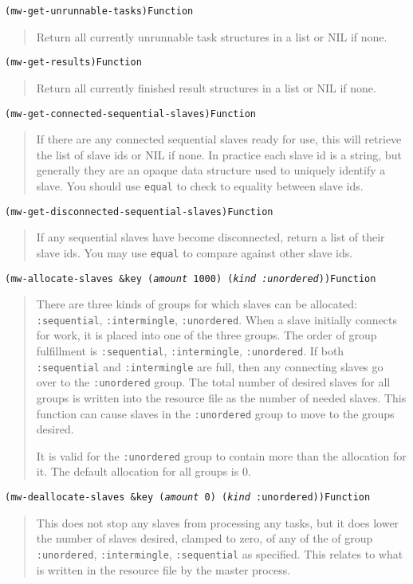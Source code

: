 \documentclass[titlepage,12pt]{book}
\newcommand{\xsmall}{\latexhtml{\small}{}}
\newcommand{\xnormalsize}{\latexhtml{\normalsize}{}}
\newcommand{\un}{\texttt{:unordered}\xspace}
\newcommand{\inter}{\texttt{:intermingle}\xspace}
\newcommand{\seq}{\texttt{:sequential}\xspace}
\newcommand{\func}[1]{\xsmall\mbox{\uppercase{\texttt{#1}}}\xnormalsize\xspace}
\newcommand{\apifunc}[2]{\noindent\xsmall\texttt{(#1)}\hspace*{\fill}\xnormalsize\texttt{#2}}
\newenvironment{apientry}[2]
	{\apifunc{#1}{#2}\begin{quotation}}
	{\end{quotation}}
\begin{document}
\begin{apientry}
{mw-get-unrunnable-tasks}
{Function}
Return all currently unrunnable task structures in a list or NIL if none.
\end{apientry}

\begin{apientry}
{mw-get-results}
{Function}
Return all currently finished result structures in a list or NIL if none.
\end{apientry}

\begin{apientry}
{mw-get-connected-sequential-slaves}
{Function}
If there are any connected sequential slaves ready for use, this will
retrieve the list of slave ids or NIL if none. In practice each slave
id is a string, but generally they are an opaque data structure used
to uniquely identify a slave. You should use \func{equal} to check
to equality between slave ids.
\end{apientry}

\begin{apientry}
{mw-get-disconnected-sequential-slaves}
{Function}
If any sequential slaves have become disconnected, return a list of
their slave ids. You may use \func{equal} to compare against other
slave ids.
\end{apientry}

\begin{apientry}
{mw-allocate-slaves \&key (\emph{amount} 1000) (\emph{kind :unordered})}
{Function}
There are three kinds of groups for which slaves can be allocated:
\seq, \inter, \un.  When a slave initially connects for work, it is
placed into one of the three groups.  The order of group fulfillment
is \seq, \inter, \un. If both \seq and \inter are full, then any
connecting slaves go over to the \un group. The total number of desired
slaves for all groups is written into the resource file as the number of
needed slaves. This function can cause slaves in the \un group to move to
the groups desired.

It is valid for the \un group to contain more than the allocation for
it.  The default allocation for all groups is 0.
\end{apientry}

\begin{apientry}
{mw-deallocate-slaves \&key (\emph{amount} 0) (\emph{kind} :unordered)}
{Function}
This does not stop any slaves from processing any tasks, but it does lower
the number of slaves desired, clamped to zero, of any of the of group
\un, \inter, \seq as specified. This relates to what is written in the
resource file by the master process.
\end{apientry}
\end{document}
